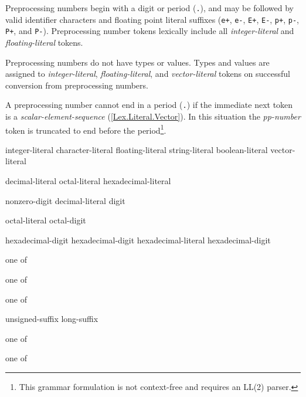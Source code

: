 \p Preprocessing numbers begin with a digit or period (\texttt{.}), and may be
followed by valid identifier characters and floating point literal suffixes
(\texttt{e+}, \texttt{e-}, \texttt{E+}, \texttt{E-}, \texttt{p+}, \texttt{p-},
\texttt{P+}, and \texttt{P-}). Preprocessing number tokens lexically include all
\textit{integer-literal} and \textit{floating-literal} tokens.

\p Preprocessing numbers do not have types or values. Types and values are
assigned to \textit{integer-literal}, \textit{floating-literal}, and
\textit{vector-literal} tokens on successful conversion from preprocessing
numbers.

\p A preprocessing number cannot end in a period (\texttt{.}) if the immediate
next token is a \textit{scalar-element-sequence} (\ref{Lex.Literal.Vector}). In
this situation the \textit{pp-number} token is truncated to end before the
period\footnote{This grammar formulation is not context-free and requires an
LL(2) parser.}.






\begin{grammar}
  \br
  integer-literal\br
  character-literal\br
  floating-literal\br
  string-literal\br
  boolean-literal\br
  vector-literal
\end{grammar}


\begin{grammar}
  \br
  decimal-literal \br
  octal-literal \br
  hexadecimal-literal \br

  \br
  nonzero-digit\br
  decimal-literal digit\br

  \br
  octal-literal octal-digit\br

  \br
   hexadecimal-digit\br
   hexadecimal-digit\br
  hexadecimal-literal hexadecimal-digit\br

   \textnormal{one of}\br
  \br

   \textnormal{one of}\br
  \br

   \textnormal{one of}\br
  \br
  \br
  \br

  \br
  unsigned-suffix \br
  long-suffix \br

   \textnormal{one of}\br
  \br

   \textnormal{one of}\br
\end{grammar}

